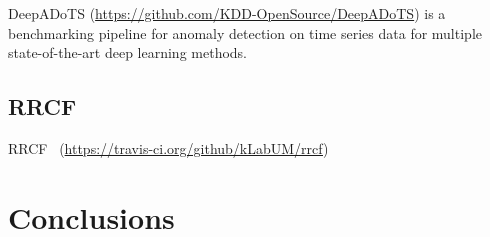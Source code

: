 DeepADoTS (\href{https://github.com/KDD-OpenSource/DeepADoTS}{https://github.com/KDD-OpenSource/DeepADoTS})
is a benchmarking pipeline for anomaly detection on
time series data for
multiple state-of-the-art deep learning methods.

\subsection{RRCF}

RRCF~\cite{bartos_2019_rrcf} (\href{https://travis-ci.org/github/kLabUM/rrcf}{https://travis-ci.org/github/kLabUM/rrcf})



\section{Conclusions} \label{sec-conclusions}






